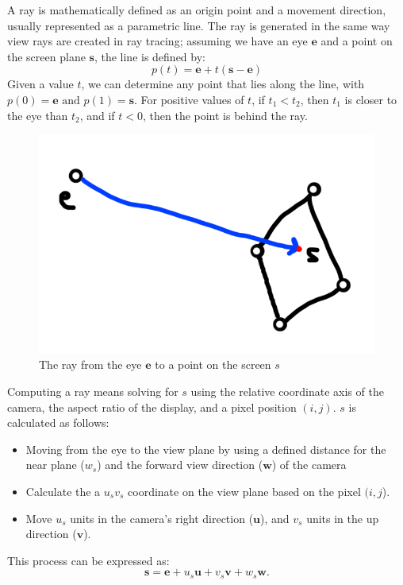 \documentclass[12pt]{report}
\begin{document}
A ray is mathematically defined as an origin point and a movement direction, usually represented as a parametric line.
The ray is generated in the same way view rays are created in ray tracing; assuming we have an eye $\mathbf{e}$ and a point on the screen plane $\mathbf{s}$, the line is defined by:
\begin{equation}
p(t) = \mathbf{e} + t(\mathbf{s} - \mathbf{e})
\end{equation}
Given a value $t$, we can determine any point that lies along the line, with $p(0) = \mathbf{e} \text{ and } p(1) = \mathbf{s}$.
For positive values of $t$, if $t_1 < t_2$, then $t_1$ is closer to the eye than $t_2$, and if $t < 0$, then the point is behind the ray.
\begin{figure}
\includegraphics{etos}
\caption{The ray from the eye $\mathbf{e}$ to a point on the screen $s$}
\end{figure}

Computing a ray means solving for $s$ using the relative coordinate axis of the camera, the aspect ratio of the display, and a pixel position $(i,j)$.
$s$ is calculated as follows:
\begin{itemize}
\item Moving from the eye to the view plane by using a defined distance for the near plane ($w_s$) and the forward view direction ($\mathbf{w}$) of the camera
\item Calculate the a $u_sv_s$ coordinate on the view plane based on the pixel $(i,j$).
\item Move $u_s$ units in the camera's right direction ($\mathbf{u}$), and $v_s$ units in the up direction ($\mathbf{v}$).
\end{itemize}
This process can be expressed as:
\begin{equation}
\mathbf{s} = \mathbf{e} + u_s\mathbf{u} +v_s\mathbf{v}+w_s\mathbf{w}.
\end{equation}
\end{document}
